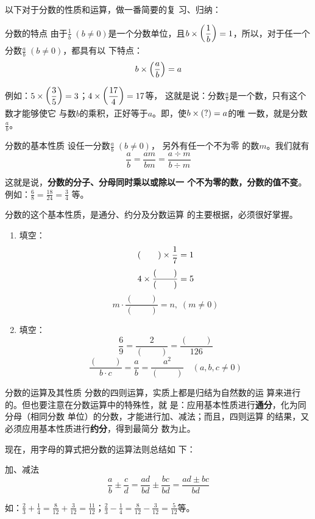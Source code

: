 以下对于分数的性质和运算，做一番简要的复
习、归纳：
\begin{blk}{分数的特点}
	由于$\frac{1}{b}\; (b\ne 0)$是一个分数单位，且$b\times\left(\dfrac{1}{b}\right)=1$，所以，对于任一个分数$\frac{a}{b}\; (b\ne 0)$，都具有以
	下特点：
	\[b\times\left(\dfrac{a}{b}\right)=a \]
\end{blk}

例如：$5\times\left(\dfrac{3}{5}\right)=3$；$4\times\left(\dfrac{17}{4}\right)=17$等，
这就是说：分数$\frac{a}{b}$是一个数，只有这个数才能够使它
与数$b$的乘积，正好等于$a$。即，使$b\times(?)=a$的唯
一数，就是分数$\frac{a}{b}$。

\begin{blk}{分数的基本性质}
	设任一分数$\frac{a}{b}\; (b\ne 0)$，
	另外有任一个不为零
	的数$m$。我们就有
	\[\frac{a}{b}=\frac{am}{bm}=\frac{a\div m}{b\div m} \]
\end{blk}

这就是说，\textbf{分数的分子、分母同时乘以或除以一
	个不为零的数，分数的值不变}。例如：$\frac{6}{8}=\frac{18}{24}=\frac{3}{4}$
等。

分数的这个基本性质，是通分、约分及分数运算
的主要根据，必须很好掌握。

\begin{ex}
	\begin{enumerate}
		\item 填空：\[(\qquad )\times \dfrac{1}{7}=1 \]\[4\times\dfrac{(\qquad)}{(\qquad )}=5\]\[m\cdot \frac{(\qquad)}{(\qquad )}=n,\; (m\ne 0)\]
		\item 填空：\[\frac{6}{9}=\frac{2}{(\qquad)}=\frac{(\qquad)}{126}\]\[\frac{(\qquad )}{b\cdot c}=\frac{a}{b}=\frac{a^2}{(\qquad )}\quad (a,b,c\ne 0)\]
	\end{enumerate}
\end{ex}


\begin{blk}{分数的运算及其性质}
	分数的四则运算，实质上都是归结为自然数的运
	算来进行的。但也要注意在分数运算中的特殊性，就
	是：应用基本性质进行\textbf{通分}，化为同分母（相同分数
	单位）的分数，才能进行加、减法；而且，四则运算
	的结果，又必须应用基本性质进行\textbf{约分}，得到最简分
	数为止。
\end{blk}


现在，用字母的算式把分数的运算法则总结如
下：

\begin{blk}{加、减法}
	\[\frac{a}{b}\pm\frac{c}{d}=\frac{ad}{bd}\pm\frac{bc}{bd}=\frac{ad\pm bc}{bd} \]
\end{blk}

如：$\frac{2}{3}+\frac{1}{4}=\frac{8}{12}+\frac{3}{12}=\frac{11}{12}$；$\frac{2}{3}-\frac{1}{4}=\frac{8}{12}-\frac{3}{12}=\frac{5}{12}$等。

